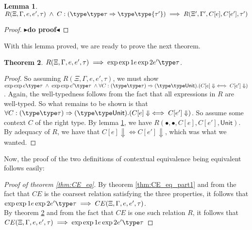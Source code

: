 \documentclass[twoside,11pt,openright]{report}
\newtheorem{theorem}{Theorem}
\newtheorem{lemma}[theorem]{Lemma}
\theoremstyle{definition}
\newcommand{\expr}{e}
\newcommand{\ctx}{C}
\newcommand{\Tunit}{\mathsf{Unit}}
\newcommand{\typ}{\tau}
\newcommand{\venv}{\Gamma}
\newcommand{\tenv}{\Xi}
\newcommand{\empvenv}{\bullet}
\newcommand{\emptenv}{\bullet}
\def\envs#1#2\exp#3\type#4{#1 \; | \; #2 \; \vdash #3 : #4}
\def\envstyp#1#2\type#3{#1 \; | \; #2 \; \vdash #3}
\def\envscteq#1#2\exp1#3\exp2#4\type#5
\newcommand{\todo}[1]{{\color[rgb]{.5,0,0}\textbf{$\blacktriangleright$#1$\blacktriangleleft$}}}
\begin{document}
\begin{lemma}\label{lem:CE_eq_part2_helper}
  $R(\tenv, \venv, \expr, \expr', \typ) \; \land \; C:(\envstyp \tenv \venv \type \typ \Rightarrow \envstyp {\tenv'} {\venv'} \type {\typ'}) \implies R(\tenv', \venv', C[\expr], C[\expr'], \typ')$
\end{lemma}
\begin{proof}
  \todo{do proof}
\end{proof}
With this lemma proved, we are ready to prove the next theorem.
\begin{theorem}\label{thm:CE_eq_part2}
  $R(\tenv, \venv, \expr, \expr', \typ) \implies \envscteq \tenv \venv \exp1 \expr \exp2 \expr' \type \typ$.
\end{theorem}
\begin{proof}
  So assuming $R(\tenv, \venv, \expr, \expr', \typ)$, we must show 
  $ \envs \tenv \venv \exp \expr \type \typ \; \land \;
    \envs \tenv \venv \exp \expr' \type \typ \; \land\\
    \forall \ctx : (\envstyp \tenv \venv \type \typ) \Rightarrow (\envstyp {\emptenv} {\empvenv} \type \Tunit) . (\ctx[\expr] \Downarrow \iff \ctx[\expr'] \Downarrow)$. Again, the well-typedness follows from the fact that all expressions in $R$ are well-typed. So what remains to be shown is that $\forall \ctx : (\envstyp \tenv \venv \type \typ) \Rightarrow (\envstyp {\emptenv} {\empvenv} \type \Tunit) . (\ctx[\expr] \Downarrow \iff \ctx[\expr'] \Downarrow)$. So assume some context $C$ of the right type. By lemma \ref{lem:CE_eq_part2_helper}, we have $R(\emptenv, \empvenv, C[\expr], C[\expr'], \Tunit)$. By adequacy of $R$, we have that $\ctx[\expr] \Downarrow \iff \ctx[\expr'] \Downarrow$, which was what we wanted.
\end{proof}

Now, the proof of the two definitions of contextual equivalence being equivalent follows easily:
\begin{proof}[Proof of theorem \ref{thm:CE_eq}]
  By theorem \ref{thm:CE_eq_part1} and from the fact that $CE$ is the coarsest relation satisfying the three properties, it follows that $\envscteq \tenv \venv \exp1 \expr \exp2 \expr' \type \typ \implies CE(\tenv, \venv, \expr, \expr', \typ)$.\\
  By theorem \ref{thm:CE_eq_part2} and from the fact that $CE$ is one such relation $R$, it follows that $CE(\tenv, \venv, \expr, \expr', \typ) \implies \envscteq \tenv \venv \exp1 \expr \exp2 \expr' \type \typ$
\end{proof}
\end{document}
